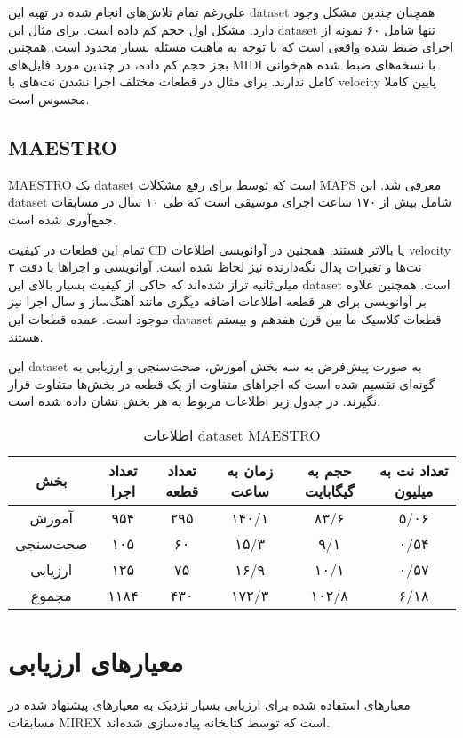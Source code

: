 علی‌رغم تمام تلاش‌های انجام شده در تهیه این \gls{dataset} همچنان چندین مشکل وجود
دارد. مشکل اول حجم کم داده است. برای مثال این \gls{dataset} تنها شامل ۶۰ نمونه
از اجرای ضبط شده واقعی است که با توجه به ماهیت مسئله بسیار محدود است. همچنین بجز
حجم کم داده، در چندین مورد فایل‌های \gls{MIDI} با نسخه‌های ضبط شده هم‌خوانی کامل
ندارند. برای مثال در قطعات مختلف اجرا نشدن نت‌های با \gls{velocity} پایین کاملا
محسوس است.

\subsection{MAESTRO}
MAESTRO یک \gls{dataset} است که توسط \cite{hawthorne2018enabling} برای رفع
مشکلات MAPS معرفی شد. این \gls{dataset} شامل بیش از ۱۷۰ ساعت اجرای موسیقی است که
طی ۱۰ سال در مسابقات  جمع‌آوری شده است.

تمام این قطعات در کیفیت CD یا بالاتر هستند. همچنین در آوانویسی اطلاعات
\gls{velocity} نت‌ها و تغیرات پدال نگه‌دارنده نیز لحاظ شده است. آوانویسی و
اجراها با دقت ۳ میلی‌ثانیه تراز شده‌اند که حاکی از کیفیت بسیار بالای این
\gls{dataset} است. همچنین علاوه بر آوانویسی برای هر قطعه اطلاعات اضافه‌ دیگری
مانند آهنگ‌ساز و سال اجرا نیز موجود است. عمده قطعات این \gls{dataset} قطعات
کلاسیک ما بین قرن هفدهم و بیستم هستند.

این \gls{dataset} به صورت پیش‌فرض به سه بخش آموزش، صحت‌سنجی و ارزیابی به گونه‌ای
تقسیم شده است که اجراهای متفاوت از یک قطعه در بخش‌ها متفاوت قرار نگیرند. در جدول
زیر اطلاعات مربوط به هر بخش نشان داده شده است.
\begin{table}[ht]
    \centering
    \begin{tabular}{|c|c|c|c|c|c|}
        \hline
        بخش & تعداد اجرا & تعداد قطعه & زمان به ساعت & حجم به گیگابایت & تعداد نت به میلیون \\
        \hline
        آموزش & ۹۵۴ & ۲۹۵ & ۱۴۰/۱ & ۸۳/۶ & ۵/۰۶ \\
        \hline
        صحت‌سنجی & ۱۰۵ & ۶۰ & ۱۵/۳ & ۹/۱ & ۰/۵۴ \\
        \hline
        ارزیابی & ۱۲۵ & ۷۵ & ۱۶/۹ & ۱۰/۱ & ۰/۵۷ \\
        \hline
        مجموع & ۱۱۸۴ & ۴۳۰ & ۱۷۲/۳ & ۱۰۲/۸ & ۶/۱۸ \\
        \hline
    \end{tabular}
    \caption{اطلاعات \gls{dataset} MAESTRO}
\end{table}

\section{معیارهای ارزیابی}
معیارهای استفاده شده برای ارزیابی بسیار نزدیک به معیارهای پیشنهاد شده در مسابقات
MIREX است که توسط کتابخانه  \cite{raffel2014mir_eval} پیاده‌سازی
شده‌اند.

